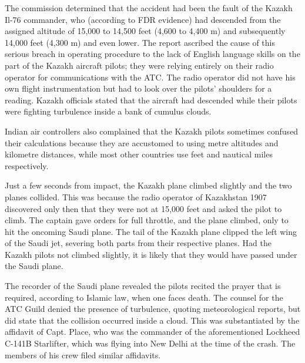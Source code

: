 \documentclass[a4paper,10pt]{article}
\begin{document}
The commission determined that the accident had been the fault of the Kazakh Il-76 commander, who (according to FDR evidence) had descended from the assigned altitude of 15,000 to 14,500 feet (4,600 to 4,400 m) and subsequently 14,000 feet (4,300 m) and even lower. The report ascribed the cause of this serious breach in operating procedure to the lack of English language skills on the part of the Kazakh aircraft pilots; they were relying entirely on their radio operator for communications with the ATC. The radio operator did not have his own flight instrumentation but had to look over the pilots' shoulders for a reading. Kazakh officials stated that the aircraft had descended while their pilots were fighting turbulence inside a bank of cumulus clouds.\par

Indian air controllers also complained that the Kazakh pilots sometimes confused their calculations because they are accustomed to using metre altitudes and kilometre distances, while most other countries use feet and nautical miles respectively.\par

Just a few seconds from impact, the Kazakh plane climbed slightly and the two planes collided. This was because the radio operator of Kazakhstan 1907 discovered only then that they were not at 15,000 feet and asked the pilot to climb. The captain gave orders for full throttle, and the plane climbed, only to hit the oncoming Saudi plane. The tail of the Kazakh plane clipped the left wing of the Saudi jet, severing both parts from their respective planes. Had the Kazakh pilots not climbed slightly, it is likely that they would have passed under the Saudi plane.\par

The recorder of the Saudi plane revealed the pilots recited the prayer that is required, according to Islamic law, when one faces death. The counsel for the ATC Guild denied the presence of turbulence, quoting meteorological reports, but did state that the collision occurred inside a cloud. This was substantiated by the affidavit of Capt. Place, who was the commander of the aforementioned Lockheed C-141B Starlifter, which was flying into New Delhi at the time of the crash. The members of his crew filed similar affidavits.\par
\end{document}
